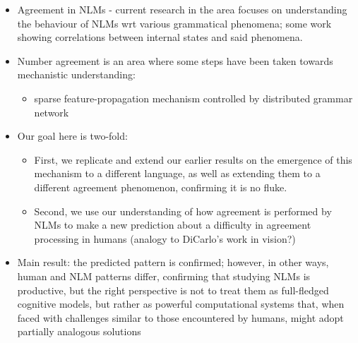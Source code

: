 \begin{itemize}
\item Agreement in NLMs - current research in the area focuses on understanding the behaviour of NLMs wrt various grammatical phenomena; some work showing correlations between internal states and said phenomena.
\item Number agreement is an area where some steps have been taken
  towards mechanistic understanding:
  \begin{itemize}
  \item sparse feature-propagation mechanism controlled by distributed
    grammar network
  \end{itemize}
\item Our goal here is two-fold:
  \begin{itemize}
  \item First, we replicate and extend our earlier results on the emergence of
  this mechanism to a different language, as well as extending them to a different agreement phenomenon, confirming it is no fluke. 
\item Second, we use our understanding of how agreement is
performed by NLMs to make a new prediction about a difficulty in agreement
processing in humans (analogy to DiCarlo's work in vision?)
  \end{itemize}
\item Main result: the predicted pattern is confirmed; however, in other ways,
  human and NLM patterns differ, confirming that studying NLMs is
  productive, but the right perspective is not to treat them as
  full-fledged cognitive models, but rather as powerful computational
  systems that, when faced with challenges similar to those
  encountered by humans, might adopt partially analogous solutions
\end{itemize}
